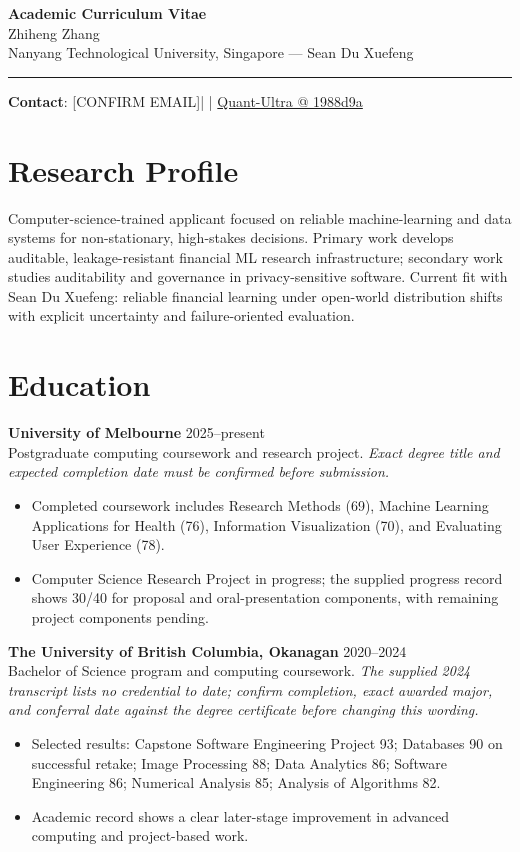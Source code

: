 \documentclass[11pt]{article}
\makeatletter
\newcommand{\ApplicantName}{Zhiheng Zhang}
\newcommand{\ApplicantEmail}{[CONFIRM EMAIL]}
\newcommand{\ApplicantPhone}{[CONFIRM PHONE]}
\newcommand{\ApplicantGitHub}{\href{https://github.com/zhiheng-zhang-Mera/Quant-Ultra/tree/1988d9a8530da91a8158de864d098ea869098923}{Quant-Ultra @ 1988d9a}}
\makeatother
\begin{document}
\begin{center}
{\LARGE\bfseries Academic Curriculum Vitae}\\[0.25em]
{\large \ApplicantName}\\
Nanyang Technological University, Singapore --- Sean Du Xuefeng
\end{center}
\vspace{0.35em}\hrule\vspace{0.65em}

\textbf{Contact}: \ApplicantEmail\quad | \quad \ApplicantPhone\quad | \quad \ApplicantGitHub

\section*{Research Profile}
Computer-science-trained applicant focused on reliable machine-learning and data systems for non-stationary, high-stakes decisions. Primary work develops auditable, leakage-resistant financial ML research infrastructure; secondary work studies auditability and governance in privacy-sensitive software. Current fit with Sean Du Xuefeng: reliable financial learning under open-world distribution shifts with explicit uncertainty and failure-oriented evaluation.

\section*{Education}
\textbf{University of Melbourne} \hfill 2025--present\\
Postgraduate computing coursework and research project. \textit{Exact degree title and expected completion date must be confirmed before submission.}
\begin{itemize}
\item Completed coursework includes Research Methods (69), Machine Learning Applications for Health (76), Information Visualization (70), and Evaluating User Experience (78).
\item Computer Science Research Project in progress; the supplied progress record shows 30/40 for proposal and oral-presentation components, with remaining project components pending.
\end{itemize}

\textbf{The University of British Columbia, Okanagan} \hfill 2020--2024\\
Bachelor of Science program and computing coursework. \textit{The supplied 2024 transcript lists no credential to date; confirm completion, exact awarded major, and conferral date against the degree certificate before changing this wording.}
\begin{itemize}
\item Selected results: Capstone Software Engineering Project 93; Databases 90 on successful retake; Image Processing 88; Data Analytics 86; Software Engineering 86; Numerical Analysis 85; Analysis of Algorithms 82.
\item Academic record shows a clear later-stage improvement in advanced computing and project-based work.
\end{itemize}
\end{document}
